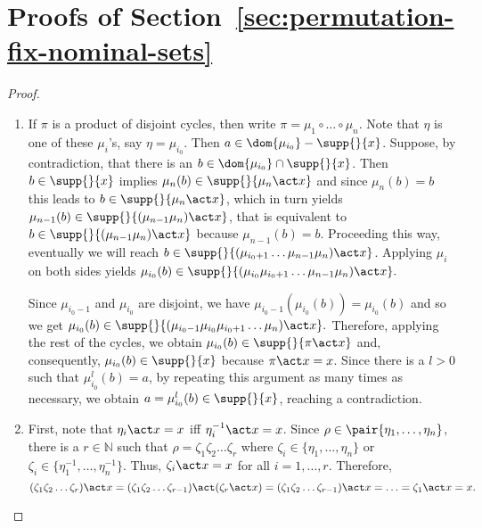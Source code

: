 \section{Proofs of Section~\ref{sec:permutation-fix-nominal-sets}}\label{app:permutation-fix-nominal-sets}

\generated*

  \begin{proof}
    \begin{enumerate}
        \item 
   
     If $\pi$ is a product of disjoint cycles, then write $\pi = \mu_1\circ\ldots\circ\mu_n$. Note that $\eta$ is one of these $\mu_{i}$'s, say $\eta = \mu_{i_0}$. Then $a\in \dom{\mu_{i_0}} - \supp{}{x}$. Suppose, by contradiction, that there is an $b\in \dom{\mu_{i_0}}\cap \supp{}{x}$. Then  $b\in\supp{}{x}$ implies $\mu_{n}(b)\in\supp{}{\mu_n\act x}$ and since $\mu_n(b) = b$ this leads to $b\in\supp{}{\mu_n\act x}$, which in turn yields $\mu_{n-1}(b)\in\supp{}{(\mu_{n-1}\mu_n)\act x}$, that is equivalent to $b\in\supp{}{(\mu_{n-1}\mu_n)\act x}$ because $\mu_{n-1}(b) = b$. Proceeding this way, eventually we will reach $b\in\supp{}{(\mu_{i_0+1}\ldots\mu_{n-1}\mu_n)\act x}$. Applying $\mu_i$ on both sides yields
     \(
          \mu_{i_0}(b)\in\supp{}{(\mu_{i_0}\mu_{i_0+1}\ldots\mu_{n-1}\mu_n)\act x}.
     \)
     
     Since $\mu_{i_0-1}$ and $\mu_{i_0}$ are disjoint, we have $\mu_{i_0-1}(\mu_{i_0}(b)) = \mu_{i_0}(b)$ and so we get
     \(
          \mu_{i_0}(b)\in\supp{}{(\mu_{i_0-1}\mu_{i_0}\mu_{i_0+1}\ldots\mu_n)\act x}.
     \)
     Therefore, applying the rest of the cycles, we obtain $\mu_{i_0}(b)\in\supp{}{\pi\act x}$ and, consequently, $\mu_{i_0}(b)\in\supp{}{x}$ because $\pi\act x = x$. Since there is a $l>0$ such that $\mu_{i_0}^l(b) = a$, by repeating this argument as many times as necessary, we obtain $a = \mu_{i_0}^l(b) \in \supp{}{x}$, reaching a contradiction. 

     \item First, note that $\eta_i\act x = x$ iff $\eta_i^{-1}\act x = x$. Since $\rho\in \pair{\eta_1,\ldots,\eta_n}$, there is a $r\in \mathbb{N}$ such that $\rho = \zeta_1\zeta_2\ldots\zeta_r$ where $\zeta_i\in \{\eta_1,\ldots,\eta_n\}$ or $\zeta_i\in \{\eta_1^{-1},\ldots,\eta_n^{-1}\}$. Thus, $\zeta_i\act x = x$ for all $i=1,\ldots,r$. Therefore,
     \[
        (\zeta_1\zeta_2\ldots\zeta_r)\act x = (\zeta_1\zeta_2\ldots\zeta_{r-1})\act(\zeta_r\act x) =  (\zeta_1\zeta_2\ldots\zeta_{r-1})\act x = \ldots =  \zeta_1\act x = x.
     \]
    \end{enumerate}
 \end{proof}

